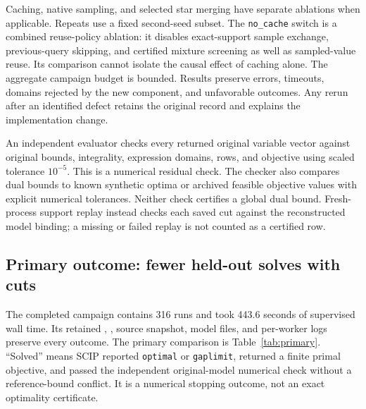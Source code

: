 Caching, native sampling, and selected star merging have separate
ablations when applicable. Repeats use a fixed second-seed subset.
The \texttt{no\_cache} switch is a combined reuse-policy ablation:
it disables exact-support sample exchange, previous-query skipping,
and certified mixture screening as well as sampled-value reuse.
Its comparison cannot isolate the causal effect of caching alone.
The aggregate campaign budget is bounded. Results preserve errors,
timeouts, domains rejected by the new component, and unfavorable
outcomes. Any rerun after an identified defect retains the original
record and explains the implementation change.

An independent evaluator checks every returned original variable
vector against original bounds, integrality, expression domains,
rows, and objective using scaled tolerance $10^{-5}$. This is a
numerical residual check. The checker also compares dual bounds to
known synthetic optima or archived feasible objective values with
explicit numerical tolerances. Neither check certifies a global dual
bound. Fresh-process support replay instead checks each saved cut
against the reconstructed model binding; a missing or failed replay
is not counted as a certified row.

\subsection{Primary outcome: fewer held-out solves with cuts}

The completed campaign contains 316 runs and took 443.6 seconds of
supervised wall time. Its retained
,
,
source snapshot, model files, and per-worker logs preserve every
outcome. The primary comparison is Table~\ref{tab:primary}.
``Solved'' means SCIP reported \texttt{optimal} or \texttt{gaplimit},
returned a finite primal objective, and passed the independent
original-model numerical check without a reference-bound conflict.
It is a numerical stopping outcome, not an exact optimality certificate.

